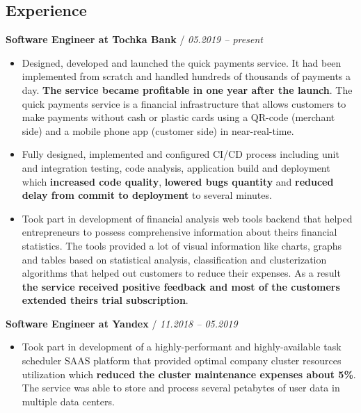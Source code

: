 \documentclass[a4paper,10pt]{article}
\newcommand{\notice}[1]{{\textcolor{dark}{\textbf{#1}}}}
\newcommand{\info}[1]{{\textcolor{darkdark}{\textbf{#1}}}}
\begin{document}
\subsection*{Experience}

    \begin{adjustwidth}{10pt}{10pt}

        \notice{Software Engineer at Tochka Bank} / \textit{05.2019 – present}

        \begin{itemize}

        \item Designed, developed and launched the quick payments service. It had been implemented from scratch and handled hundreds of thousands of payments a day. \info{The service became profitable in one year after the launch}. The quick payments service is a financial infrastructure that allows customers to make payments without cash or plastic cards using a QR-code (merchant side) and a mobile phone app (customer side) in near-real-time.

        \item Fully designed, implemented and configured CI/CD process including unit and integration testing, code analysis, application build and deployment which \info{increased code quality}, \info{lowered bugs quantity} and \info{reduced delay from commit to deployment} to several minutes.

        \item Took part in development of financial analysis web tools backend that helped entrepreneurs to possess comprehensive information about theirs financial statistics. The tools provided a lot of visual information like charts, graphs and tables based on statistical analysis, classification and clusterization algorithms that helped out customers to reduce their expenses. As a result \info{the service received positive feedback and most of the customers extended theirs trial subscription}.

        \end{itemize}


        \notice{Software Engineer at Yandex} / \textit{11.2018 – 05.2019}

        \begin{itemize}

        \item Took part in development of a highly-performant and highly-available task scheduler SAAS platform that provided optimal company cluster resources utilization which \info{reduced the cluster maintenance expenses about 5\%}. The service was able to store and process several petabytes of user data in multiple data centers.


\end{itemize}
\end{adjustwidth}
\end{document}

